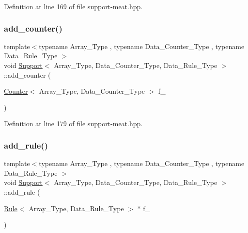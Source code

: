 Definition at line 169 of file support-\/meat.\+hpp.

\mbox{\label{class_support_a00d511970c0bf833ef8bdd7580c670cc}} 
\subsubsection{\texorpdfstring{add\+\_\+counter()}{add\_counter()}\hspace{0.1cm}{\footnotesize\ttfamily [2/2]}}
{\footnotesize\ttfamily template$<$typename Array\+\_\+\+Type , typename Data\+\_\+\+Counter\+\_\+\+Type , typename Data\+\_\+\+Rule\+\_\+\+Type $>$ \\
void \hyperlink{class_support}{Support}$<$ Array\+\_\+\+Type, Data\+\_\+\+Counter\+\_\+\+Type, Data\+\_\+\+Rule\+\_\+\+Type $>$\+::add\+\_\+counter (\begin{DoxyParamCaption}\item[{\hyperlink{class_counter}{Counter}$<$ Array\+\_\+\+Type, Data\+\_\+\+Counter\+\_\+\+Type $>$}]{f\+\_\+ }\end{DoxyParamCaption})\hspace{0.3cm}{\ttfamily [inline]}}



Definition at line 179 of file support-\/meat.\+hpp.

\mbox{\label{class_support_a3113a4586c541aa25db7b4a864b748a2}} 
\subsubsection{\texorpdfstring{add\+\_\+rule()}{add\_rule()}\hspace{0.1cm}{\footnotesize\ttfamily [1/2]}}
{\footnotesize\ttfamily template$<$typename Array\+\_\+\+Type , typename Data\+\_\+\+Counter\+\_\+\+Type , typename Data\+\_\+\+Rule\+\_\+\+Type $>$ \\
void \hyperlink{class_support}{Support}$<$ Array\+\_\+\+Type, Data\+\_\+\+Counter\+\_\+\+Type, Data\+\_\+\+Rule\+\_\+\+Type $>$\+::add\+\_\+rule (\begin{DoxyParamCaption}\item[{\hyperlink{class_rule}{Rule}$<$ Array\+\_\+\+Type, Data\+\_\+\+Rule\+\_\+\+Type $>$ $\ast$}]{f\+\_\+ }\end{DoxyParamCaption})\hspace{0.3cm}{\ttfamily [inline]}}



